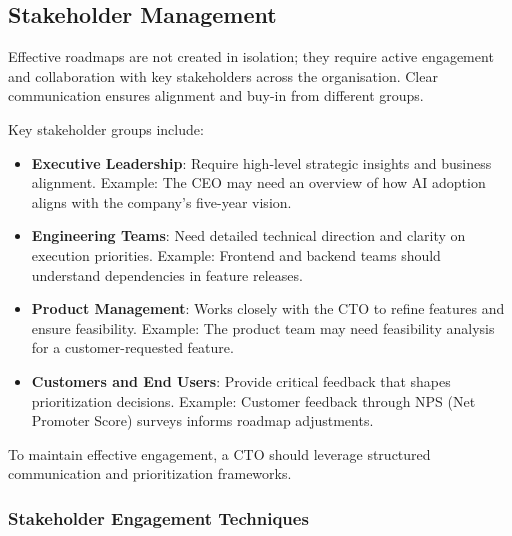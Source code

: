 \subsection{Stakeholder Management}

Effective roadmaps are not created in isolation; they require active engagement and collaboration with key stakeholders across the organisation. Clear communication ensures alignment and buy-in from different groups.

Key stakeholder groups include:

\begin{itemize}
    \item \textbf{Executive Leadership}: Require high-level strategic insights and business alignment. Example: The CEO may need an overview of how AI adoption aligns with the company's five-year vision.
    \item \textbf{Engineering Teams}: Need detailed technical direction and clarity on execution priorities. Example: Frontend and backend teams should understand dependencies in feature releases.
    \item \textbf{Product Management}: Works closely with the CTO to refine features and ensure feasibility. Example: The product team may need feasibility analysis for a customer-requested feature.
    \item \textbf{Customers and End Users}: Provide critical feedback that shapes prioritization decisions. Example: Customer feedback through NPS (Net Promoter Score) surveys informs roadmap adjustments.
\end{itemize}

To maintain effective engagement, a CTO should leverage structured communication and prioritization frameworks.

\subsubsection{Stakeholder Engagement Techniques}

